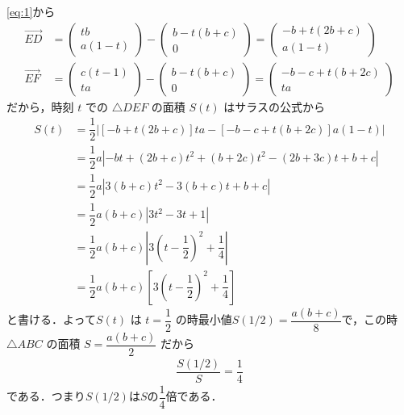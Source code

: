 \documentclass[../../main.tex]{subfiles}
\begin{document}
\cref{eq:1}から
\begin{align}
  \overrightarrow{ED} &=
  \begin{pmatrix} tb \\ a(1-t)
  \end{pmatrix} -
  \begin{pmatrix} b-t(b+c) \\ 0
  \end{pmatrix} =
  \begin{pmatrix} -b+t(2b+c) \\ a(1-t)
  \end{pmatrix} \\
  \overrightarrow{EF} &=
  \begin{pmatrix} c(t-1) \\ ta
  \end{pmatrix} -
  \begin{pmatrix} b-t(b+c) \\ 0
  \end{pmatrix} =
  \begin{pmatrix} -b-c+t(b+2c) \\ ta
  \end{pmatrix}
\end{align}
だから，時刻 $t$ での $\triangle DEF$ の面積 $S(t)$ はサラスの公式から
\begin{align}
  S(t) &= \dfrac{1}{2} \left| [-b+t(2b+c)] ta - [-b-c+t(b+2c)] a(1-t) \right| \\
  &= \dfrac{1}{2} a \left| -bt + (2b+c)t^2 + (b+2c)t^2 - (2b+3c)t + b+c \right| \\
  &= \dfrac{1}{2} a \left| 3(b+c)t^2 - 3(b+c)t + b+c \right| \\
  &= \dfrac{1}{2} a(b+c) \left| 3t^2 - 3t + 1 \right| \\
  &= \dfrac{1}{2} a(b+c) \left| 3\left(t - \dfrac{1}{2}\right)^2 + \dfrac{1}{4} \right| \\
  &= \dfrac{1}{2} a(b+c) \left[ 3\left(t - \dfrac{1}{2}\right)^2 + \dfrac{1}{4} \right]
\end{align}
と書ける．よって$S(t)$ は $t = \dfrac{1}{2}$ の時最小値$S(1/2)=\dfrac{a(b+c)}{8}$で，この時 $\triangle ABC$ の面積 $S=\dfrac{a(b+c)}{2}$ だから
\begin{align}
  \dfrac{S(1/2)}{S} = \dfrac{1}{4}
\end{align}
である．つまり$S(1/2)$は$S$の$\dfrac{1}{4}$倍である．

\newpage
\end{document}

